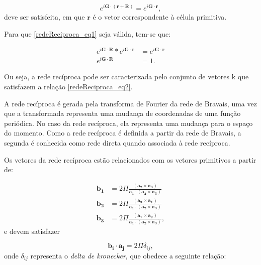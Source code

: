       \begin{equation}\label{redeReciproca_eq1}
        e^{i\mathbf{G}\cdot (\mathbf{r}+\mathbf{R})} = e^{i\mathbf{G}\cdot\mathbf{r}},
      \end{equation}
      deve ser satisfeita, em que $\mathbf{r}$ é o vetor correspondente à célula primitiva.

      Para que \eqref{redeReciproca_eq1} seja válida, tem-se que:

      \begin{align}\label{redeReciproca_eq2}
        e^{i\mathbf{G}\cdot\mathbf{R}}\ast e^{i\mathbf{G}\cdot\mathbf{r}} &= e^{i\mathbf{G}\cdot\mathbf{r}}\\
        e^{i\mathbf{G}\cdot\mathbf{R}}                                    &= 1.
      \end{align}

      Ou seja, a rede recíproca pode ser caracterizada pelo conjunto de vetores k que satisfazem a relação \eqref{redeReciproca_eq2}. 
      
      A rede recíproca é gerada pela transforma de Fourier da rede de Bravais, uma vez que a transformada representa uma mudança de coordenadas de uma função periódica\cite{qm_fis7}. No caso da rede recíproca, ela representa uma mudança para o espaço do momento\cite{qm_fis8}. Como a rede recíproca é definida a partir da rede de Bravais, a segunda é conhecida como rede direta quando associada à rede recíproca\cite{qm_fis5}.
      
      Os vetores da rede recíproca estão relacionados com os vetores primitivos a partir de:
      
      \begin{align}\label{redeReciproca_eq3}
        \mathbf{b_{1}} &= 2 \Pi \frac{(\mathbf{a_{2}} \times \mathbf{a_{3}})} {\mathbf{a_{1}} \cdot (\mathbf{a_{2}} \times \mathbf{a_{3}})}\\
        \mathbf{b_{2}} &= 2 \Pi \frac{(\mathbf{a_{3}} \times \mathbf{a_{1}})} {\mathbf{a_{1}} \cdot (\mathbf{a_{2}} \times \mathbf{a_{3}})}\\
        \mathbf{b_{3}} &= 2 \Pi \frac{(\mathbf{a_{1}} \times \mathbf{a_{2}})} {\mathbf{a_{1}} \cdot (\mathbf{a_{2}} \times \mathbf{a_{3}})},
      \end{align}
      e devem satisfazer

      \begin{equation}\label{redeReciproca_eq4}
        \mathbf{b_{i}}\cdot \mathbf{a_{j}} = 2\Pi \delta_{ij},
      \end{equation}
      onde $\delta_{ij}$ representa o \textit{delta de kronecker}, que obedece a seguinte relação:

